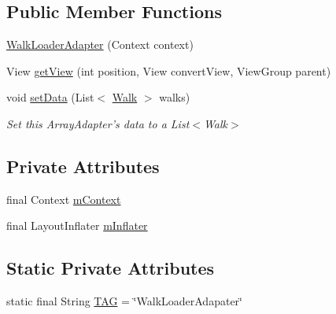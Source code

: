 \subsection*{Public Member Functions}
\begin{DoxyCompactItemize}
\item 
\hyperlink{classuk_1_1ac_1_1swan_1_1digitaltrails_1_1sync_1_1_walk_loader_adapter_a55e1339f6dc3c03b5e7afa437f424f1f}{Walk\+Loader\+Adapter} (Context context)
\item 
View \hyperlink{classuk_1_1ac_1_1swan_1_1digitaltrails_1_1sync_1_1_walk_loader_adapter_ac442affbd8305e34a5fe4ab99de99218}{get\+View} (int position, View convert\+View, View\+Group parent)
\item 
void \hyperlink{classuk_1_1ac_1_1swan_1_1digitaltrails_1_1sync_1_1_walk_loader_adapter_a1a475da8a52475f4ad4ccbfa7925639e}{set\+Data} (List$<$ \hyperlink{classuk_1_1ac_1_1swan_1_1digitaltrails_1_1components_1_1_walk}{Walk} $>$ walks)
\begin{DoxyCompactList}\small\item\em Set this Array\+Adapter's data to a List$<$\+Walk$>$ \end{DoxyCompactList}\end{DoxyCompactItemize}
\subsection*{Private Attributes}
\begin{DoxyCompactItemize}
\item 
final Context \hyperlink{classuk_1_1ac_1_1swan_1_1digitaltrails_1_1sync_1_1_walk_loader_adapter_a7c6f05839f481abb7ca31c9f0803d7e0}{m\+Context}
\item 
final Layout\+Inflater \hyperlink{classuk_1_1ac_1_1swan_1_1digitaltrails_1_1sync_1_1_walk_loader_adapter_a0c9b737acae2b1a1f92246d1d3fde68d}{m\+Inflater}
\end{DoxyCompactItemize}
\subsection*{Static Private Attributes}
\begin{DoxyCompactItemize}
\item 
static final String \hyperlink{classuk_1_1ac_1_1swan_1_1digitaltrails_1_1sync_1_1_walk_loader_adapter_a2fd52aa3ac92edbca2c86250cb670a5f}{T\+A\+G} = \char`\"{}Walk\+Loader\+Adapater\char`\"{}
\end{DoxyCompactItemize}


